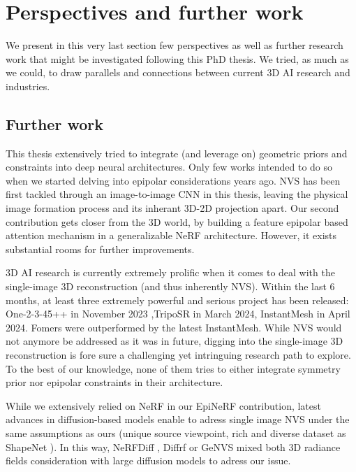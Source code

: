 \section{Perspectives and further work}
We present in this very last section few perspectives as well as further research work that might be investigated following this PhD thesis. We tried, as much as we could, to draw parallels and connections between current 3D \ac{AI} research and industries. 

\subsection{Further work}
This thesis extensively tried to integrate (and leverage on) geometric priors and constraints into deep neural architectures. Only few works intended to do so when we started delving into epipolar considerations years ago. \ac{NVS} has been first tackled through an image-to-image \ac{CNN} in this thesis, leaving the physical image formation process and its inherant 3D-2D projection apart. Our second contribution gets closer from the 3D world, by building a feature epipolar based attention mechanism in a generalizable \ac{NeRF} architecture. However, it exists substantial rooms for further improvements. 

3D \ac{AI} research is currently extremely prolific when it comes to deal with the single-image 3D reconstruction (and thus inherently \ac{NVS}). Within the last 6 months, at least three extremely powerful and serious project has been released:  One-2-3-45++ \citep{liu2023one2345++} in November 2023 ,TripoSR \citep{tochilkin2024triposr} in March 2024, InstantMesh \citep{xu2024instantmesh} in April 2024. Fomers were outperformed by the latest InstantMesh. While \ac{NVS} would not anymore be addressed as it was in future, digging into the single-image 3D reconstruction is fore sure a challenging yet intringuing research path to explore. To the best of our knowledge, none of them tries to either integrate symmetry prior nor epipolar constraints in their architecture.


While we extensively relied on \ac{NeRF} in our EpiNeRF contribution, latest advances in diffusion-based models enable to adress single image \ac{NVS} under the same assumptions as ours (unique source viewpoint, rich and diverse dataset as ShapeNet \citep{chang2015shapenet}). In this way, NeRFDiff \citep{gu2023nerfdiff}, Diffrf \citep{muller2023diffrf} or GeNVS \citep{chan2023genvs} mixed both 3D radiance fields consideration with large diffusion models to adress our issue. 

